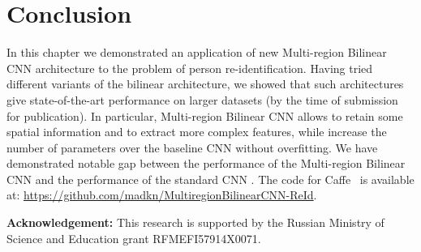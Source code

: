 \section{Conclusion}
In this chapter we demonstrated an application of new Multi-region Bilinear CNN architecture to the problem of person re-identification.
Having tried different variants of the bilinear architecture, we showed that such architectures give state-of-the-art performance on larger datasets (by the time of submission for publication). %
In particular, Multi-region Bilinear CNN allows to retain some spatial information and to extract more complex features, while increase the number of parameters over the baseline CNN without overfitting. We have demonstrated notable gap between the performance of the Multi-region Bilinear CNN and the performance of the standard CNN \citep{yi2014deep}.  The code for Caffe~\citep{jia2014caffe} is available at: \url{https://github.com/madkn/MultiregionBilinearCNN-ReId}.

\textbf{Acknowledgement:} This research is supported by the Russian Ministry of Science and Education grant RFMEFI57914X0071.